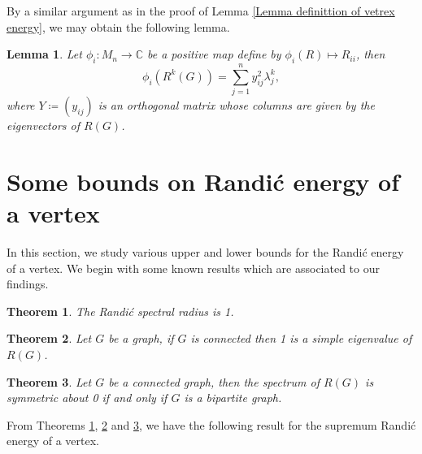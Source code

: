 \documentclass[10 pt]{article}
\newtheorem{theorem}{Theorem}[section]
\newtheorem{lemma}{Lemma}[section]
\numberwithin{equation}{section}
\begin{document}
By a similar argument as in the proof of Lemma \ref{Lemma definittion of vetrex energy}, we may obtain the following lemma.
\begin{lemma}\label{Lemma of iith entry of Randic higher power}
Let $\phi_i:M_n\rightarrow \mathbb{C}$ be a positive map define by $\phi_i(R)\mapsto R_{ii}$, then
$$\phi_i(R^k(G))=\sum\limits_{j=1}^ny^{2}_{ij}\lambda_j^k,$$
where $Y\coloneqq(y_{ij})$ is an orthogonal matrix whose columns are given by the eigenvectors of $R(G)$.
\end{lemma}



\section{Some bounds on Randi\'c energy of a vertex}
In this section, we study various upper and lower bounds for the Randi\'c energy of a vertex. We begin with some known results which are associated to our findings.

\begin{theorem}\label{Randic spectral radius}\cite{Liu2012}
The Randi\'c spectral radius is 1.
\end{theorem}
\begin{theorem}\label{Randic spectral radius multiplicity}\cite{Liu2012}
Let $G$ be a graph, if $G$ is connected then 1 is a simple eigenvalue of $R(G)$.
\end{theorem}
\begin{theorem}\label{Randic eigenvalue symmetricity}\cite{Li2015}
Let $G$ be a connected graph, then the spectrum of $R(G)$ is symmetric about 0 if and only if $G$ is a bipartite graph.
\end{theorem}


From Theorems \ref{Randic spectral radius}, \ref{Randic spectral radius multiplicity} and \ref{Randic eigenvalue symmetricity}, we have the following result for the supremum Randi\'c energy of a vertex.
\end{document}
